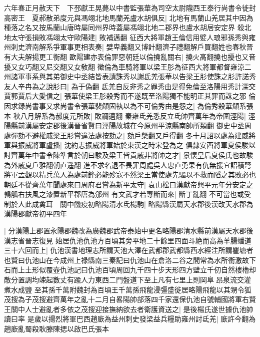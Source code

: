 六年春正月赦天下　下邳獻王晃薨以中書監張華為司空太尉隴西王泰行尚書令徙封高密王　夏郝散弟度元與馮翊北地馬蘭羌盧水胡俱反|{
	北地有馬蘭山羌居其中因為種落之名又按馬蘭山唐時屬同州界時蓋屬馮翊北地二郡界也盧水胡居安定界}
殺北地太守張損敗馮翊太守歐陽建|{
	敗補邁翻}
征西大將軍趙王倫信用嬖人琅邪孫秀與雍州刺史濟南解系爭軍事更相表奏|{
	嬖卑義翻又博計翻濟子禮翻解戶買翻姓也春秋晉有大夫解揚更工衡翻}
歐陽建亦表倫罪惡朝廷以倫撓亂關右|{
	撓火高翻撓也擾也又音擾又女巧翻又尼交翻又女敎翻}
徵倫為車騎將軍以梁王肜為征西大將軍都督雍涼二州諸軍事系與其弟御史中丞結皆表請誅秀以謝氐羌張華以告梁王肜使誅之肜許諾秀友人辛冉為之說肜曰|{
	為于偽翻}
氐羌自反非秀之罪秀由是得免倫至洛陽用秀計深交賈郭賈后大愛信之|{
	張華使梁王肜殺秀而不遂既至洛陽獨不能明正其罪而誅之邪}
倫因求録尚書事又求尚書令張華裴頠固執以為不可倫秀由是怨之|{
	為倫秀殺華頠系張本}
秋八月解系為郝度元所敗|{
	敗禰邁翻}
秦雍氐羌悉反立氐帥齊萬年為帝圍涇陽|{
	涇陽縣前漢屬安定郡後漢晉省賢曰涇陽故城在今原州平涼縣南帥所類翻}
御史中丞周處彈劾不避權戚梁王肜嘗違法處按劾之|{
	劾戶槩翻又戶得翻}
冬十月詔以處為建威將軍與振威將軍盧播|{
	沈約志振威將軍始於東漢之時宋登為之}
俱隸安西將軍夏侯駿以討齊萬年中書令陳準言於朝曰駿及梁王皆貴戚非將帥之才|{
	景懷皇后夏侯氏也故駿為外戚夏戶雅翻朝直遥翻}
進不求名退不畏罪周處吳人忠直勇果有仇無援宜詔積弩將軍孟觀以精兵萬人為處前鋒必能殄寇不然梁王當使處先驅以不救而䧟之其敗必也朝廷不從齊萬年聞處來曰周府君嘗為新平太守|{
	袁山松曰漢獻帝興平元年分安定之鶉觚右扶風之漆置新平郡唐為邠州}
有文武才若專斷而來|{
	斷丁亂翻}
不可當也或受制於人此成禽耳　關中饑疫初略陽清水氐楊駒|{
	略陽縣漢屬天水郡後漢改天水郡為漢陽郡獻帝初平四年}


|{
	分漢陽上郡置永陽郡魏改為廣魏郡武帝泰始中更名略陽郡清水縣前漢屬天水郡後漢志省晉志復見}
始居仇池仇池方百頃其旁平地二十餘里四面斗絶而高為羊腸蟠道三十六回而上|{
	仇池漢書地理志所謂天池大澤在武都郡武都縣西水經注所謂瞿塘者也賢曰仇池山在今成州上禄縣南三秦記曰仇池山在倉洛二谷之間常為水所衝激故下石而上土形似覆壺仇池記曰仇池百頃周回九千四十步天形四方壁立千仞自然樓櫓却敵分置調均竦起數丈有踰人力東西二門盤道下至上凡有七里上則岡阜昂泉流交灌煮水成鹽}
至其孫千萬附魏封為百頃王千萬孫飛龍浸彊盛徙居略陽飛龍以其甥令狐茂搜為子茂搜避齊萬年之亂十二月自畧陽帥部落四千家還保仇池自號輔國將軍右賢王關中人士避亂者多依之茂搜迎接撫納欲去者衛護資送之|{
	是後楊氏遂世據仇池帥讀曰率}
是歲以揚烈將軍巴西趙廞為益州刺史發梁益兵糧助雍州討氐羌|{
	廞許今翻為趙廞亂蜀殺耿滕陳揌以啟巴氏張本}


